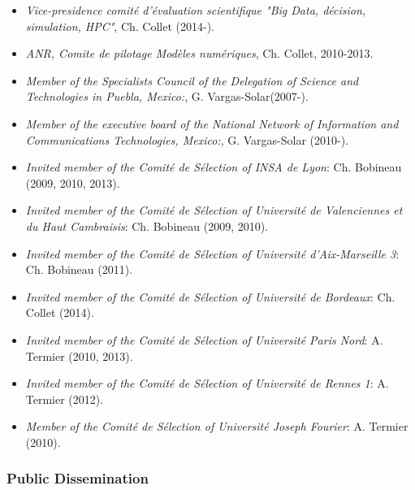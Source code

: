 \begin{itemize}
\setlength{\itemindent}{-0.5cm}
\setlength{\itemsep}{-0.1cm}

\item {\it Vice-presidence  comit{\'e} d'{\'e}valuation scientifique  "Big Data, d{\'e}cision, simulation, HPC"},   Ch. Collet (2014-).

\item {\it ANR, Comite  de pilotage Mod{\`e}les num{\'e}riques}, Ch. Collet, 2010-2013.

\item {\it Member of the Specialists Council of the Delegation of Science and Technologies in Puebla, Mexico:}, G. Vargas-Solar(2007-).

\item {\it Member of the executive board of the National Network of Information and Communications Technologies, Mexico:}, G. Vargas-Solar (2010-).

\item {\it Invited member of the Comit{\'e} de S{\'e}lection of INSA de Lyon}: Ch. Bobineau (2009, 2010, 2013).

\item {\it Invited member of the Comit{\'e} de S{\'e}lection of Universit{\'e} de Valenciennes et du Haut Cambraisis}: Ch. Bobineau (2009, 2010).

\item {\it Invited member of the Comit{\'e} de S\'election of Universit{\'e} d'Aix-Marseille 3}: Ch. Bobineau (2011).

\item {\it Invited member of the Comit{\'e} de S\'election of Universit{\'e} de Bordeaux}: Ch. Collet (2014).

\item {\it Invited member of the Comit\'e de S\'election of Universit\'e Paris Nord}: A. Termier (2010, 2013).

\item {\it Invited member of the Comit\'e de S\'election of Universit\'e de Rennes 1}: A. Termier (2012).

\item {\it Member of the Comit\'e de S\'election of Universit\'e Joseph Fourier}: A. Termier (2010).

\end{itemize}


\subsubsection{Public Dissemination}

